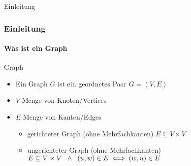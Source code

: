 \begin{frame}
    \Huge Einleitung
\end{frame}
\begin{frame}
    \frametitle{Einleitung}
    \framesubtitle{Was ist ein Graph}
    \begin{KITexampleblock}{Graph}
\begin{itemize}
    \item Ein Graph $G$ ist ein geordnetes Paar $G = (V, E)$
    \item $V$ Menge von Knoten/Vertices
    \item $E$ Menge von Kanten/Edges
    \begin{itemize}
        \item gerichteter Graph (ohne Mehrfachkanten) $E \subseteq V \times V$
        \item ungerichteter Graph (ohne Mehrfachkanten) $E \subseteq V \times V \hspace{0.2cm} \land \hspace{0.2cm} (u,w) \in E \iff (w,u) \in E$
    \end{itemize}
\end{itemize}
    \end{KITexampleblock}
\end{frame}

